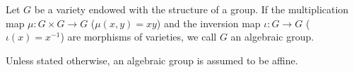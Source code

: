 Let $G$ be a variety endowed with the structure of a group. If the multiplication map $\mu: G \times G \rightarrow G$ ($\mu(x, y) = xy$) and the inversion map $\iota: G \rightarrow G$ ($\iota(x) = x^{-1}$) are morphisms of varieties, we call $G$ an algebraic group.

Unless stated otherwise, an algebraic group is assumed to be affine.
